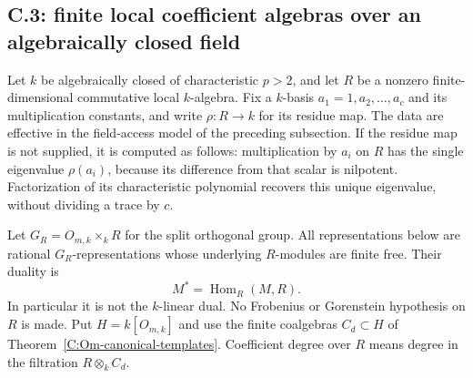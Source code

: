 \subsection{C.3: finite local coefficient algebras over an algebraically closed field}

Let $k$ be algebraically closed of characteristic $p>2$, and let $R$ be a
nonzero finite-dimensional commutative local $k$-algebra. Fix a $k$-basis
$a_1=1,a_2,\ldots,a_c$ and its multiplication constants, and write
$\rho:R\to k$ for its residue map. The data are effective in the field-access
model of the preceding subsection. If the residue map is not supplied, it
is computed as follows: multiplication by $a_i$ on $R$ has the single
eigenvalue $\rho(a_i)$, because its difference from that scalar is
nilpotent. Factorization of its characteristic polynomial recovers this
unique eigenvalue, without dividing a trace by $c$.

Let $G_R=O_{m,k}\times_k R$ for the split orthogonal group. All representations
below are rational $G_R$-representations whose underlying $R$-modules are
finite free. Their duality is
\[
                 M^*=\operatorname{Hom}_R(M,R).
\]
In particular it is not the $k$-linear dual. No Frobenius or Gorenstein
hypothesis on $R$ is made. Put $H=k[O_{m,k}]$ and use the finite coalgebras
$C_d\subset H$ of Theorem~\ref{C:Om-canonical-templates}. Coefficient degree
over $R$ means degree in the filtration $R\otimes_k C_d$.

